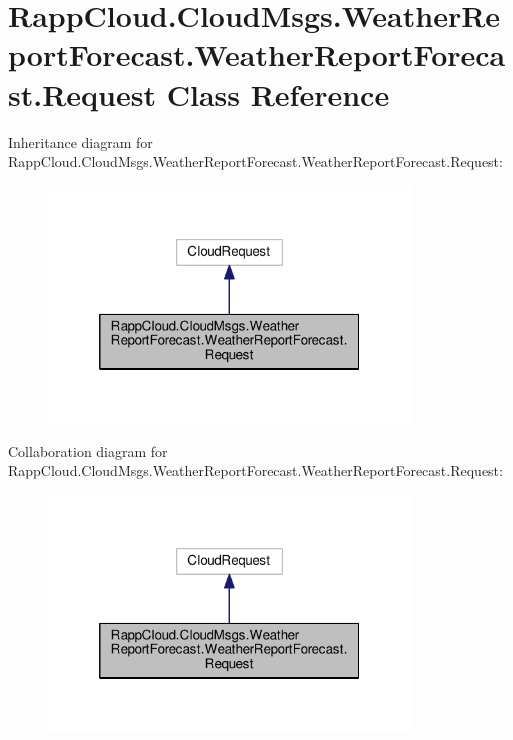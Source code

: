 \hypertarget{classRappCloud_1_1CloudMsgs_1_1WeatherReportForecast_1_1WeatherReportForecast_1_1Request}{\section{Rapp\-Cloud.\-Cloud\-Msgs.\-Weather\-Report\-Forecast.\-Weather\-Report\-Forecast.\-Request Class Reference}
\label{classRappCloud_1_1CloudMsgs_1_1WeatherReportForecast_1_1WeatherReportForecast_1_1Request}
}


Inheritance diagram for Rapp\-Cloud.\-Cloud\-Msgs.\-Weather\-Report\-Forecast.\-Weather\-Report\-Forecast.\-Request\-:
\nopagebreak
\begin{figure}[H]
\begin{center}
\leavevmode
\includegraphics[width=272pt]{classRappCloud_1_1CloudMsgs_1_1WeatherReportForecast_1_1WeatherReportForecast_1_1Request__inherit__graph}
\end{center}
\end{figure}


Collaboration diagram for Rapp\-Cloud.\-Cloud\-Msgs.\-Weather\-Report\-Forecast.\-Weather\-Report\-Forecast.\-Request\-:
\nopagebreak
\begin{figure}[H]
\begin{center}
\leavevmode
\includegraphics[width=272pt]{classRappCloud_1_1CloudMsgs_1_1WeatherReportForecast_1_1WeatherReportForecast_1_1Request__coll__graph}
\end{center}
\end{figure}
